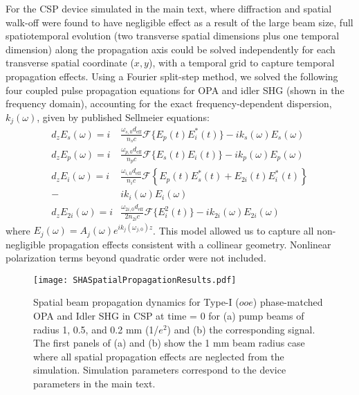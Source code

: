 \documentclass[%
 reprint,
 amsmath,amssymb,
 aps,
floatfix,
]{revtex4-2}
\begin{document}
For the CSP device simulated in the main text, where diffraction and spatial walk-off were found to have negligible effect as a result of the large beam size, full spatiotemporal evolution (two transverse spatial dimensions plus one temporal dimension) along the propagation axis could be solved independently for each transverse spatial coordinate ($x,y$), with a temporal grid to capture temporal propagation effects. Using a Fourier split-step method, we solved the following four coupled pulse propagation equations for OPA and idler SHG (shown in the frequency domain), accounting for the exact frequency-dependent dispersion, $k_j(\omega)$, given by published Sellmeier equations:
\begin{align}
    d_{z}E_s(\omega) = i& \frac{\omega_{s,0} d_{\text{eff}}}{n_s c} \mathcal{F} \{E_p(t) E_i^*(t)\} - i k_s(\omega)E_s(\omega) \label{eq:time-s} \\
    d_{z}E_p(\omega) = i& \frac{\omega_{p,0} d_{\text{eff}}}{n_p c} \mathcal{F} \{E_s(t) E_i(t)\} - i k_p(\omega)E_p(\omega) \label{eq:time-p} \\
    d_{z}E_i(\omega) = i& \frac{\omega_{i,0} d_{\text{eff}}}{n_i c} \mathcal{F} \left\{E_p(t) E_s^*(t) + E_{2i}(t) E_i^*(t)\right\} \nonumber \\
    -& i k_i(\omega)E_i(\omega) \label{eq:time-i} \\
    d_{z}E_{2i}(\omega) = i& \frac{\omega_{2i,0} d_{\text{eff}}}{2n_{2i} c} \mathcal{F} \{E_i^2(t)\} - i k_{2i}(\omega)E_{2i}(\omega) \label{eq:time-2i}
\end{align}
\noindent where  $E_j (\omega)=A_j (\omega)e^{i k_j (\omega_{j,0})z}$. This model allowed us to capture all non-negligible propagation effects consistent with a collinear geometry. Nonlinear polarization terms beyond quadratic order were not included.


\begin{figure}[htbp]
    \centering
        \texttt{[image: SHASpatialPropagationResults.pdf]}
        \caption{Spatial beam propagation dynamics for Type-I ($ooe$) phase-matched OPA and Idler SHG in CSP at time = 0 for (a) pump beams of radius 1, 0.5, and 0.2 mm (1/$e^2$) and (b) the corresponding signal. The first panels of (a) and (b) show the 1 mm beam radius case where all spatial propagation effects are neglected from the simulation. Simulation parameters correspond to the device parameters in the main text.}
    \label{fig:spatialresults}
\end{figure}
\end{document}
